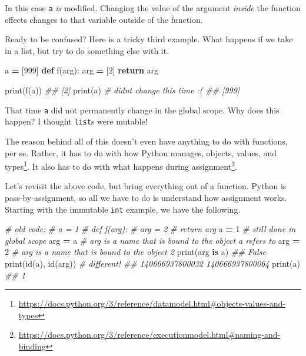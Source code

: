 \documentclass[
  12pt,
  krantz2]{krantz}
\makeatletter
\newenvironment{Shaded}{\begin{snugshade}}{\end{snugshade}}
\newcommand{\BuiltInTok}[1]{#1}
\newcommand{\CommentTok}[1]{\textcolor[rgb]{0.37,0.37,0.37}{\textit{#1}}}
\newcommand{\ControlFlowTok}[1]{\textcolor[rgb]{0.27,0.27,0.27}{\textbf{#1}}}
\newcommand{\DecValTok}[1]{\textcolor[rgb]{0.06,0.06,0.06}{#1}}
\newcommand{\KeywordTok}[1]{\textcolor[rgb]{0.27,0.27,0.27}{\textbf{#1}}}
\newcommand{\NormalTok}[1]{#1}
\newcommand{\OperatorTok}[1]{\textcolor[rgb]{0.43,0.43,0.43}{\textbf{#1}}}
\renewcommand{\href}[2]{#2\footnote{\url{#1}}}
\newenvironment{kframe}{%
\medskip{}
\setlength{\fboxsep}{.8em}
 \def\at@end@of@kframe{}%
 \ifinner\ifhmode%
  \def\at@end@of@kframe{\end{minipage}}%
  \begin{minipage}{\columnwidth}%
 \fi\fi%
 \def\FrameCommand##1{\hskip\@totalleftmargin \hskip-\fboxsep
 \colorbox{shadecolor}{##1}\hskip-\fboxsep
     \hskip-\linewidth \hskip-\@totalleftmargin \hskip\columnwidth}%
 \MakeFramed {\advance\hsize-\width
   \@totalleftmargin\z@ \linewidth\hsize
   \@setminipage}}%
 {\par\unskip\endMakeFramed%
 \at@end@of@kframe}
\renewenvironment{Shaded}{\begin{kframe}}{\end{kframe}}
\makeatother
\begin{document}
In this case \texttt{a} \emph{is} modified. Changing the value of the argument \emph{inside} the function effects changes to that variable outside of the function.

Ready to be confused? Here is a tricky third example. What happens if we take in a list, but try to do something else with it.

\begin{Shaded}
\begin{Highlighting}[]
\NormalTok{a }\OperatorTok{=}\NormalTok{ [}\DecValTok{999}\NormalTok{]}
\KeywordTok{def}\NormalTok{ f(arg):}
\NormalTok{  arg }\OperatorTok{=}\NormalTok{ [}\DecValTok{2}\NormalTok{]}
  \ControlFlowTok{return}\NormalTok{ arg}

\BuiltInTok{print}\NormalTok{(f(a))}
\CommentTok{\#\# [2]}
\BuiltInTok{print}\NormalTok{(a) }\CommentTok{\# didn\textquotesingle{}t change this time :(}
\CommentTok{\#\# [999]}
\end{Highlighting}
\end{Shaded}

That time \texttt{a} did not permanently change in the global scope. Why does this happen? I thought \texttt{list}s were mutable!

The reason behind all of this doesn't even have anything to do with functions, per se. Rather, it has to do with how Python manages, \href{https://docs.python.org/3/reference/datamodel.html\#objects-values-and-types}{objects, values, and types}. It also has to do with what happens during \href{https://docs.python.org/3/reference/executionmodel.html\#naming-and-binding}{assignment}.

Let's revisit the above code, but bring everything out of a function. Python is pass-by-assignment, so all we have to do is understand how assignment works. Starting with the immutable \texttt{int} example, we have the following.

\begin{Shaded}
\begin{Highlighting}[]
\CommentTok{\# old code: }
\CommentTok{\# a = 1}
\CommentTok{\# def f(arg):}
\CommentTok{\#   arg = 2}
\CommentTok{\#   return arg}
\NormalTok{a }\OperatorTok{=} \DecValTok{1}    \CommentTok{\# still done in global scope}
\NormalTok{arg }\OperatorTok{=}\NormalTok{ a  }\CommentTok{\# arg is a name that is bound to the object a refers to}
\NormalTok{arg }\OperatorTok{=} \DecValTok{2}  \CommentTok{\# arg is a name that is bound to the object 2}
\BuiltInTok{print}\NormalTok{(arg }\KeywordTok{is}\NormalTok{ a)}
\CommentTok{\#\# False}
\BuiltInTok{print}\NormalTok{(}\BuiltInTok{id}\NormalTok{(a), }\BuiltInTok{id}\NormalTok{(arg)) }\CommentTok{\# different!\textasciigrave{}}
\CommentTok{\#\# 140666937800032 140666937800064}
\BuiltInTok{print}\NormalTok{(a)}
\CommentTok{\#\# 1}
\end{Highlighting}
\end{Shaded}
\end{document}
